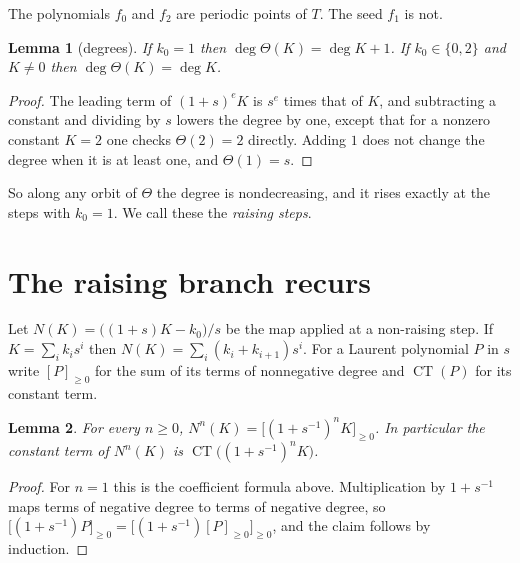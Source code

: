 \documentclass[11pt,a4paper]{article}
\newtheorem{lemma}{Lemma}
\theoremstyle{remark}
\newcommand{\CT}{\operatorname{CT}}
\begin{document}
The polynomials $f_0$ and $f_2$ are periodic points of $T$. The seed $f_1$ is not.

\begin{lemma}[degrees]\label{lem:deg}
If $k_0=1$ then $\deg\Theta(K)=\deg K+1$. If $k_0\in\{0,2\}$ and $K\ne0$ then
$\deg\Theta(K)=\deg K$.
\end{lemma}
\begin{proof}
The leading term of $(1+s)^eK$ is $s^e$ times that of $K$, and subtracting a constant and
dividing by $s$ lowers the degree by one, except that for a nonzero constant $K=2$ one checks
$\Theta(2)=2$ directly. Adding $1$ does not change the degree when it is at least one, and
$\Theta(1)=s$.
\end{proof}

So along any orbit of $\Theta$ the degree is nondecreasing, and it rises exactly at the steps
with $k_0=1$. We call these the \emph{raising steps}.

\section{The raising branch recurs}

Let $N(K)=\bigl((1+s)K-k_0\bigr)/s$ be the map applied at a non-raising step. If
$K=\sum_i k_is^i$ then $N(K)=\sum_i(k_i+k_{i+1})s^i$. For a Laurent polynomial $P$ in $s$ write
$[P]_{\ge0}$ for the sum of its terms of nonnegative degree and $\CT(P)$ for its constant term.

\begin{lemma}\label{lem:N}
For every $n\ge0$, $N^n(K)=\bigl[(1+s^{-1})^nK\bigr]_{\ge0}$. In particular the constant term of
$N^n(K)$ is $\CT\bigl((1+s^{-1})^nK\bigr)$.
\end{lemma}
\begin{proof}
For $n=1$ this is the coefficient formula above. Multiplication by $1+s^{-1}$ maps terms of
negative degree to terms of negative degree, so
$\bigl[(1+s^{-1})P\bigr]_{\ge0}=\bigl[(1+s^{-1})[P]_{\ge0}\bigr]_{\ge0}$, and the claim follows by
induction.
\end{proof}
\end{document}
